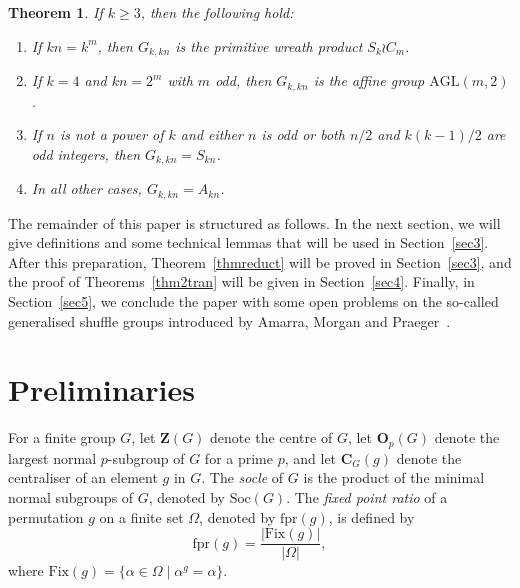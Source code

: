 \documentclass[11pt,a4paper,reqno]{amsart}
\newcommand{\AGL}{\mathrm{AGL}}
\newcommand{\Fix}{\mathrm{Fix}}
\newcommand{\fpr}{\mathrm{fpr}}
\newcommand{\Soc}{\mathrm{Soc}}
\newcommand{\Sym}{\mathrm{Sym}}
\newcommand{\Sh}{\mathrm{Sh}}
\newcommand{\Z}{\mathbf{Z}}
\newtheorem{theorem}{Theorem}[section]
\theoremstyle{definition}
\begin{document}
\begin{theorem}\label{classification}
  If $k\geq 3$, then the following hold:
  \begin{enumerate}[\rm(a)]
        \item If $kn=k^m$, then $G_{k,kn}$ is the primitive wreath product $S_k\wr C_m$.
        \item If $k=4$ and $kn=2^m$ with $m$ odd,  then $G_{k,kn}$ is the affine group $\AGL(m,2)$.
        \item If $n$ is not a power of $k$ and either $n$ is odd or both $n/2$ and $k(k-1)/2$ are odd integers, then $G_{k,kn}=S_{kn}$.
        \item In all other cases, $G_{k,kn}=A_{kn}$.
  \end{enumerate}
\end{theorem}



The remainder of this paper is structured as follows. In the next section, we will give definitions and some technical lemmas that will be used in Section~\ref{sec3}. After this preparation, Theorem~\ref{thmreduct} will be proved in Section~\ref{sec3}, and the proof of Theorems~\ref{thm2tran} will be given in Section~\ref{sec4}. Finally, in Section~\ref{sec5}, we conclude the paper with some open problems on the so-called generalised shuffle groups introduced by Amarra, Morgan and Praeger~\cite{AMP2021}.


\section{Preliminaries}\label{sec2}

For a finite group $G$, let $\Z(G)$ denote the centre of $G$, let $\mathbf{O}_p(G)$ denote the largest normal $p$-subgroup of $G$ for a prime $p$, and let $\mathbf{C}_G(g)$ denote the centraliser of an element $g$ in $G$. The \emph{socle} of $G$ is the product of the minimal normal subgroups of $G$, denoted by $\Soc(G)$. The \emph{fixed point ratio} of a permutation $g$ on a finite set $\Omega$, denoted by $\fpr(g)$, is defined by
\[
\fpr(g)=\frac{|\Fix(g)|}{|\Omega|},
\]
where $\Fix(g)=\{\alpha\in\Omega\mid\alpha^g=\alpha\}$.
%
\end{document}
